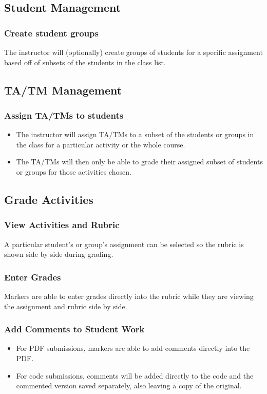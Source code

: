 \documentclass{article}
\begin{document}
\subsection{Student Management}
\subsubsection{Create student groups}
The instructor will (optionally) create groups of students for a specific assignment
based off of subsets of the students in the class list.
\subsection{TA/TM Management}
\subsubsection{Assign TA/TMs to students \label{AssignTA}}
\begin{itemize}
	\item The instructor will assign TA/TMs to a subset of the students or groups in the class
		for a particular activity or the whole course.
	\item The TA/TMs will then only be able to grade their assigned subset of students
		or groups for those activities chosen.
\end{itemize}

\subsection{Grade Activities \label{grading}}
\subsubsection{View Activities and Rubric}
A particular student's or group's assignment can be selected so the rubric is
shown side by side during grading.
\subsubsection{Enter Grades}
Markers are able to enter grades directly into the rubric while they are viewing
the assignment and rubric side by side.
\subsubsection{Add Comments to Student Work}
\begin {itemize}
	\item For PDF submissions, markers are able to add comments directly into the PDF.
	\item For code submissions, comments will be added directly to the code 
and the commented version saved separately, also leaving a copy of the original.
\end {itemize}
\end{document}
